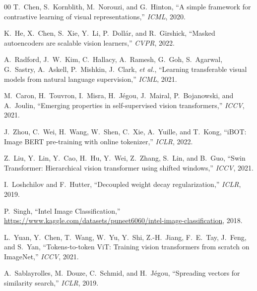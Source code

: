 \documentclass[journal]{IEEEtran}
\begin{document}
\begin{thebibliography}{00}
T.~Chen, S.~Kornblith, M.~Norouzi, and G.~Hinton,
``A simple framework for contrastive learning of visual representations,''
\textit{ICML}, 2020.

K.~He, X.~Chen, S.~Xie, Y.~Li, P.~Doll\'ar, and R.~Girshick,
``Masked autoencoders are scalable vision learners,''
\textit{CVPR}, 2022.

A.~Radford, J.~W.~Kim, C.~Hallacy, A.~Ramesh, G.~Goh, S.~Agarwal, G.~Sastry,
A.~Askell, P.~Mishkin, J.~Clark, \textit{et al.},
``Learning transferable visual models from natural language supervision,''
\textit{ICML}, 2021.

M.~Caron, H.~Touvron, I.~Misra, H.~J\'egou, J.~Mairal, P.~Bojanowski, and A.~Joulin,
``Emerging properties in self-supervised vision transformers,''
\textit{ICCV}, 2021.

J.~Zhou, C.~Wei, H.~Wang, W.~Shen, C.~Xie, A.~Yuille, and T.~Kong,
``iBOT: Image BERT pre-training with online tokenizer,''
\textit{ICLR}, 2022.

Z.~Liu, Y.~Lin, Y.~Cao, H.~Hu, Y.~Wei, Z.~Zhang, S.~Lin, and B.~Guo,
``Swin Transformer: Hierarchical vision transformer using shifted windows,''
\textit{ICCV}, 2021.

I.~Loshchilov and F.~Hutter,
``Decoupled weight decay regularization,''
\textit{ICLR}, 2019.

P.~Singh,
``Intel Image Classification,''
\url{https://www.kaggle.com/datasets/puneet6060/intel-image-classification}, 2018.

L.~Yuan, Y.~Chen, T.~Wang, W.~Yu, Y.~Shi, Z.-H.~Jiang, F.~E.~Tay, J.~Feng, and S.~Yan,
``Tokens-to-token ViT: Training vision transformers from scratch on ImageNet,''
\textit{ICCV}, 2021.

A.~Sablayrolles, M.~Douze, C.~Schmid, and H.~J\'egou,
``Spreading vectors for similarity search,''
\textit{ICLR}, 2019.

\end{thebibliography}
\end{document}

